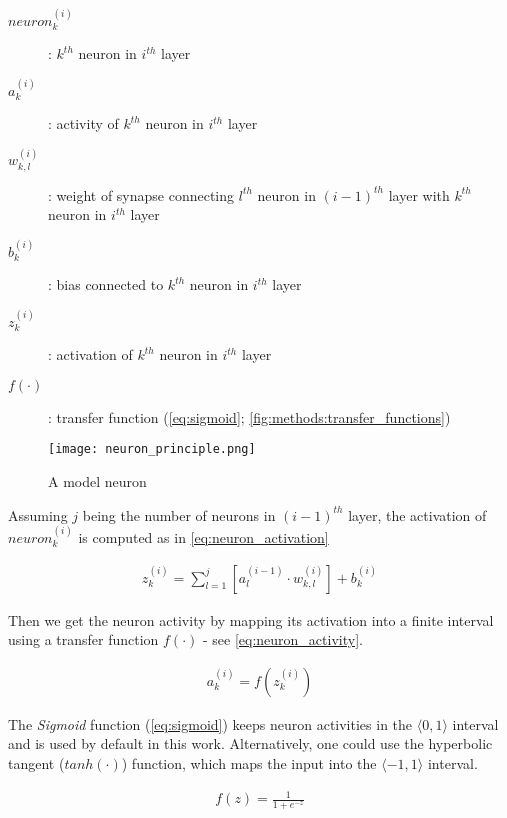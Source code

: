 \begin{description}
\item[$ neuron_k^{(i)} $] : $ k^{th} $ neuron in $ i^{th} $ layer
\item[$ a_k^{(i)} $] : activity of $ k^{th} $ neuron in $ i^{th} $ layer
\item[$ w_{k,l}^{(i)} $] : weight of synapse connecting $ l^{th} $ neuron in $ (i-1)^{th} $ layer with $ k^{th} $ neuron in $ i^{th} $ layer
\item[$ b_k^{(i)} $] : bias connected to $ k^{th} $ neuron in $ i^{th} $ layer
\item[$ z_k^{(i)} $] : activation of $ k^{th} $ neuron in $ i^{th} $ layer
\item[$ f(\cdot) $] : transfer function (\cref{eq:sigmoid}; \cref{fig:methods:transfer_functions})
\end{description}

\begin{figure}[H]
  \centering
  \texttt{[image: neuron\_principle.png]}
  \caption{A model neuron}
  \label{fig:methods:model_neuron}
\end{figure}

Assuming $ j $ being the number of neurons in $ (i-1)^{th} $ layer, the activation of $ neuron_k^{(i)} $ is computed as in \cref{eq:neuron_activation}

\begin{align} \label{eq:neuron_activation}
z_k^{(i)} = \displaystyle{\sum_{l=1}^{j} [a_l^{(i-1)} \cdot w_{k,l}^{(i)}]} + b_k^{(i)}
\end{align}

Then we get the neuron activity by mapping its activation into a finite interval using a transfer function $ f(\cdot) $ - see \cref{eq:neuron_activity}. 

\begin{align} \label{eq:neuron_activity}
a_k^{(i)} = f(z_k^{(i)})
\end{align}

The \textit{Sigmoid} function (\cref{eq:sigmoid}) keeps neuron activities in the $ \langle0, 1\rangle $ interval and is used by default in this work. Alternatively, one could use the hyperbolic tangent ($ tanh(\cdot) $) function, which maps the input into the $ \langle-1, 1\rangle $ interval.

\begin{align} \label{eq:sigmoid}
f(z) = \frac{1}{1 + e^{-z}}
\end{align}

